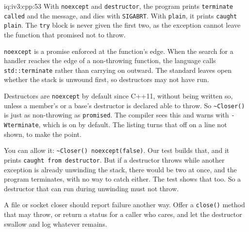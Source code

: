 \begin{solution}{iq:iv3:cpp:53}
With \texttt{noexcept} and \texttt{destructor}, the program prints \texttt{terminate called} and the message, and dies with \texttt{SIGABRT}. With \texttt{plain}, it prints \texttt{caught plain}. The \texttt{try} block is never given the first two, as the exception cannot leave the function that promised not to throw.

\texttt{noexcept} is a promise enforced at the function's edge. When the search for a handler reaches the edge of a non-throwing function, the language calls \texttt{std::terminate} rather than carrying on outward. The standard leaves open whether the stack is unwound first, so destructors may not have run.

Destructors are \texttt{noexcept} by default since C++11, without being written so, unless a member's or a base's destructor is declared able to throw. So \texttt{\textasciitilde{}Closer()} is just as non-throwing as \texttt{promised}. The compiler sees this and warns with \texttt{-Wterminate}, which is on by default. The listing turns that off on a line not shown, to make the point.

You can allow it: \texttt{\textasciitilde{}Closer() noexcept(false)}. Our test builds that, and it prints \texttt{caught from destructor}. But if a destructor throws while another exception is already unwinding the stack, there would be two at once, and the program terminates, with no way to catch either. The test shows that too. So a destructor that can run during unwinding must not throw.

A file or socket closer should report failure another way. Offer a \texttt{close()} method that may throw, or return a status for a caller who cares, and let the destructor swallow and log whatever remains.

\end{solution}

